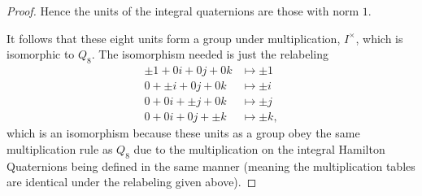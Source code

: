 \documentclass[11pt]{article}
\begin{document}
\begin{enumerate}
\begin{proof}
        Hence the units of the integral quaternions are those with norm $1$.
        
        It follows that these eight units form a group under multiplication, $I^{\times}$, which is isomorphic to $Q_8$. The isomorphism needed is just the relabeling \begin{align*}
            \pm 1 + 0i+0j+0k &\mapsto \pm 1\\
            0+ \pm i + 0j+0k &\mapsto \pm i\\
            0+ 0i+ \pm j +0k &\mapsto \pm j\\
            0+ 0i+0j + \pm k &\mapsto \pm k,
        \end{align*} which is an isomorphism because these units as a group obey the same multiplication rule as $Q_8$ due to the multiplication on the integral Hamilton Quaternions being defined in the same manner (meaning the multiplication tables are identical under the relabeling given above).
    \end{proof}
\end{enumerate}
\end{document}
